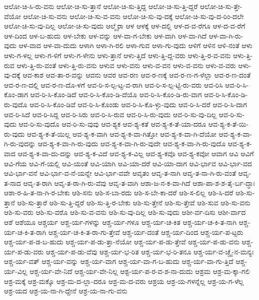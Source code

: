 {ಆಲೋ-ಚಿ-ಸಿ-ರು-ವನು
ಆಲೋ-ಚಿ-ಸು-ತ್ತಾನೆ
ಆಲೋ-ಚಿ-ಸು-ತ್ತಿದ್ದ
ಆಲೋ-ಚಿ-ಸು-ತ್ತಿ-ದ್ದರೆ
ಆಲೋ-ಚಿ-ಸು-ತ್ತೇ-ವೆಯೋ
ಆಲೋ-ಚಿ-ಸು-ವನು
ಆಲೋ-ಚಿ-ಸು-ವ-ವನು
ಆಲೋ-ಚಿ-ಸು-ವು-ದಕ್ಕೆ
ಆಲೋ-ಚಿ-ಸು-ವು-ದ-ರಿಂ-ದಲೇ
ಆಲೋ-ಚಿ-ಸು-ವು-ದಿಲ್ಲ
ಆಲೋ-ಚಿ-ಸು-ವುದು
ಆಲ್ಮೈರಾ
ಆಳ
ಆಳಕ್ಕೆ
ಆಳ-ದಲ್ಲಿ
ಆಳ-ದ-ವ-ರೆಗೂ
ಆಳ-ದ-ವ-ರೆಗೆ
ಆಳ-ದಿಂದ
ಆಳ-ಬ-ಹುದು
ಆಳ-ಬೇಕು
ಆಳ-ವನ್ನು
ಆಳ-ವಾ-ಗ-ಬೇಕು
ಆಳ-ವಾಗಿ
ಆಳ-ವಾ-ಗಿದೆ
ಆಳ-ವಾ-ಗಿ-ರು-ವುದು
ಆಳ-ವಾದ
ಆಳ-ವಾ-ದುದು
ಆಳಾಗಿ
ಆಳಾ-ಗಿ-ರಲಿ
ಆಳಾ-ಗುವ
ಆಳಾ-ಗು-ವುದು
ಆಳಿಗೆ
ಆಳಿನ
ಆಳಿ-ನಂತೆ
ಆಳು
ಆಳು-ಗ-ಳಲ್ಲ
ಆಳು-ಗ-ಳಿಗೆ
ಆಳು-ಗ-ಳೇನು
ಆಳು-ತ್ತಾನೆ
ಆಳು-ತ್ತಿದೆ
ಆಳು-ತ್ತಿ-ದ್ದ-ವರು
ಆಳು-ತ್ತಿ-ರ-ವ-ವನು
ಆಳು-ತ್ತಿ-ರುವ
ಆಳು-ತ್ತಿ-ರು-ವಂತೆ
ಆಳು-ತ್ತಿ-ರು-ವನು
ಆಳುವ
ಆಳು-ವನು
ಆಳು-ವ-ವನ
ಆಳು-ವ-ವನು
ಆಳು-ವ-ವರು
ಆಳು-ವು-ದಕ್ಕೆ
ಆವ-ಕಾಶ
ಆವ-ತಾ-ರ-ವನ್ನು
ಆವನು
ಆವರ
ಆವ-ರಣ
ಆವ-ರ-ಣಕ್ಕೆ
ಆವ-ರ-ಣ-ಗ-ಳೆಲ್ಲಾ
ಆವ-ರ-ಣ-ದಂತೆ
ಆವ-ರ-ಣ-ದಲ್ಲಿ
ಆವ-ರ-ಣ-ದೊ-ಳಗೆ
ಆವ-ರಿ-ಸ-ಲ್ಪ-ಟ್ಟ-ವ-ರಾಗಿ
ಆವ-ರಿ-ಸ-ಲ್ಪ-ಟ್ಟಿ-ರು-ವರು
ಆವ-ರಿಸಿ
ಆವ-ರಿ-ಸಿ-ಕೊಂ-ಡಾಗ
ಆವ-ರಿ-ಸಿ-ಕೊಂ-ಡಿದೆ
ಆವ-ರಿ-ಸಿ-ಕೊಂ-ಡಿ-ದೆಯೊ
ಆವ-ರಿ-ಸಿ-ಕೊಂ-ಡಿ-ರು-ವಾಗ
ಆವ-ರಿ-ಸಿ-ಕೊಂ-ಡಿ-ರು-ವುದೊ
ಆವ-ರಿ-ಸಿ-ಕೊಂ-ಡಿವೆ
ಆವ-ರಿ-ಸಿ-ಕೊಂಡು
ಆವ-ರಿ-ಸಿ-ಕೊ-ಳ್ಳು-ವುದು
ಆವ-ರಿ-ಸಿ-ದರೆ
ಆವ-ರಿ-ಸಿ-ದಾಗ
ಆವ-ರಿ-ಸಿದೆ
ಆವ-ರಿ-ಸಿದ್ದ
ಆವ-ರಿ-ಸಿರು
ಆವ-ರಿ-ಸಿ-ರುವ
ಆವ-ರಿ-ಸಿ-ರು-ವುದು
ಆವ-ರಿ-ಸು-ವು-ದಿಲ್ಲ
ಆವ-ರಿ-ಸು-ವುದು
ಆವ-ರಿ-ಸು-ವುದೊ
ಆವ-ರಿ-ಸು-ವುವು
ಆವ-ಶ್ಯಕ
ಆವ-ಶ್ಯ-ಕತೆ
ಆವ-ಶ್ಯ-ಕ-ತೆ-ಯಾ-ದರೂ
ಆವ-ಶ್ಯ-ಕ-ತೆ-ಯಿ-ರು-ವುದು
ಆವ-ಶ್ಯ-ಕ-ತೆ-ಯಿಲ್ಲ
ಆವ-ಶ್ಯ-ಕ-ವಾಗಿ
ಆವ-ಶ್ಯ-ಕ-ವಾ-ಗಿತ್ತೋ
ಆವ-ಶ್ಯ-ಕ-ವಾ-ಗಿ-ದೆಯೋ
ಆವ-ಶ್ಯ-ಕ-ವಾ-ಗಿ-ರು-ವುದನ್ನು
ಆವ-ಶ್ಯ-ಕ-ವಾ-ಗಿ-ರು-ವುದು
ಆವ-ಶ್ಯ-ಕ-ವಾ-ಗಿ-ರು-ವುದೇ
ಆವ-ಶ್ಯ-ಕ-ವಾ-ಗಿ-ರು-ವುದೊ
ಆವ-ಶ್ಯ-ಕ-ವಾದ
ಆವ-ಶ್ಯ-ಕ-ವಾ-ದು-ದನ್ನು
ಆವ-ಶ್ಯ-ಕ-ವಿದೆ
ಆವ-ಶ್ಯ-ಕ-ವಿಲ್ಲ
ಆವ-ಶ್ಯ-ಕವೊ
ಆವ-ಶ್ಯ-ಕವೋ
ಆವಾಗ
ಆವಿ
ಆವಿಗೆ
ಆವಿ-ಗೆಯ
ಆವಿ-ಗೆ-ಯಲ್ಲಿ
ಆವಿ-ಯಂತೆ
ಆವಿ-ಯಾಗಿ
ಆವಿ-ಯಾ-ದರೆ
ಆವಿ-ಯಾ-ದಾಗ
ಆವಿ-ರ್ಭಾವ
ಆವಿ-ರ್ಭಾ-ವದ
ಆವಿ-ರ್ಭಾ-ವನೆ
ಆವಿ-ರ್ಭಾ-ವ-ನೆ-ಯನ್ನೇ
ಆವಿ-ರ್ಭಾ-ವವೇ
ಆವೃತಂ
ಆವೃ-ತ-ನಾಗಿ
ಆವೃ-ತ-ನಾ-ಗಿ-ರು-ವಂತೆ
ಆವೃ-ತ-ನಾದ
ಆವೃ-ತ-ರಾಗಿ
ಆವೃ-ತ-ರಾ-ಗಿ-ರು-ವೆವು
ಆವೃ-ತ-ವಾಗಿ
ಆಶಾ-ಜ-ನ-ಕ-ವಾ-ಗಿದೆ
ಆಶಾ-ಪಾ-ಶ-ಶ-ತೈ-ರ್ಬ-ದ್ಧಾಃ
ಆಶಾ-ರ-ಹಿ-ತ-ನಾ-ಗಿ-ರ-ಬೇಕು
ಆಶಿ-ಸನು
ಆಶಿ-ಸ-ಬಾ-ರದು
ಆಶಿ-ಸ-ಬೇ-ಕಾ-ದರೆ
ಆಶಿ-ಸ-ಲಿಲ್ಲ
ಆಶಿ-ಸಿ-ದರೆ
ಆಶಿ-ಸು-ತ್ತಾನೆ
ಆಶಿ-ಸು-ತ್ತಾರೆ
ಆಶಿ-ಸು-ತ್ತಿ-ದ್ದರೆ
ಆಶಿ-ಸು-ತ್ತಿ-ರ-ಬೇಕು
ಆಶಿ-ಸು-ತ್ತೇನೆ
ಆಶಿ-ಸು-ತ್ತೇವೆ
ಆಶಿ-ಸುವ
ಆಶಿ-ಸು-ವನು
ಆಶಿ-ಸು-ವರು
ಆಶಿ-ಸು-ವರೊ
ಆಶಿ-ಸು-ವ-ವನು
ಆಶಿ-ಸು-ವು-ದಿಲ್ಲ
ಆಶಿ-ಸು-ವುದು
ಆಶೀ-ರ್ವ-ದಿಸು
ಆಶೀ-ರ್ವಾದ
ಆಶೆ
ಆಶೆಯೂ
ಆಶ್ಚರ್ಯ
ಆಶ್ಚ-ರ್ಯ-ಗಳನ್ನು
ಆಶ್ಚ-ರ್ಯ-ಗಳೂ
ಆಶ್ಚ-ರ್ಯ-ಚ-ಕಿತ
ಆಶ್ಚ-ರ್ಯ-ಚ-ಕಿ-ತ-ನಾಗಿ
ಆಶ್ಚ-ರ್ಯ-ಚ-ಕಿ-ತ-ರಾಗಿ
ಆಶ್ಚ-ರ್ಯ-ಚ-ಕಿ-ತ-ರಾ-ಗು-ತ್ತೇವೆ
ಆಶ್ಚ-ರ್ಯ-ದಂತೆ
ಆಶ್ಚ-ರ್ಯ-ದಿಂದ
ಆಶ್ಚ-ರ್ಯ-ಪ-ಟ್ಟರು
ಆಶ್ಚ-ರ್ಯ-ಪ-ಡ-ಬ-ಹುದು
ಆಶ್ಚ-ರ್ಯ-ಪ-ಡು-ತ್ತಾ-ನೆಯೋ
ಆಶ್ಚ-ರ್ಯ-ಪ-ಡು-ತ್ತೇವೆ
ಆಶ್ಚ-ರ್ಯ-ಪ-ಡು-ವನು
ಆಶ್ಚ-ರ್ಯ-ಪ-ಡು-ವರು
ಆಶ್ಚ-ರ್ಯ-ಪ-ಡು-ವೆವು
ಆಶ್ಚ-ರ್ಯ-ಭ-ರಿತ
ಆಶ್ಚ-ರ್ಯ-ಭ-ರಿ-ತನೂ
ಆಶ್ಚ-ರ್ಯ-ವ-ಚ್ಚೈ-ನ-ಮನ್ಯಃ
ಆಶ್ಚ-ರ್ಯ-ವತ್
ಆಶ್ಚ-ರ್ಯ-ವನ್ನು
ಆಶ್ಚ-ರ್ಯ-ವಾಗ
ಆಶ್ಚ-ರ್ಯ-ವಾ-ಗ-ಬ-ಹುದು
ಆಶ್ಚ-ರ್ಯ-ವಾ-ಗು-ತ್ತಿದೆ
ಆಶ್ಚ-ರ್ಯ-ವಿಲ್ಲ
ಆಶ್ಚ-ರ್ಯ-ವೇ-ನಿದೆ
ಆಶ್ಚ-ರ್ಯ-ವೇ-ನಿಲ್ಲ
ಆಶ್ಟ-ರ್ಯ-ಪ-ರ-ವ-ಶ-ನಾ-ದುದು
ಆಶ್ರಮ
ಆಶ್ರ-ಮ-ಕ್ಕಾ-ಗಲಿ
ಆಶ್ರ-ಮಕ್ಕೆ
ಆಶ್ರ-ಮಕ್ಕೊ
ಆಶ್ರ-ಮ-ದ-ಲ್ಲಾ-ದರೂ
ಆಶ್ರ-ಮ-ದ-ವರು
ಆಶ್ರಯ
ಆಶ್ರ-ಯ-ಗಳನ್ನೆಲ್ಲ
ಆಶ್ರ-ಯ-ಗ-ಳೆಲ್ಲ
ಆಶ್ರ-ಯದ
ಆಶ್ರ-ಯ-ನಾ-ಗಿ-ದ್ದೇನೆ
ಆಶ್ರ-ಯ-ನಾ-ಗು-ವನು
}
